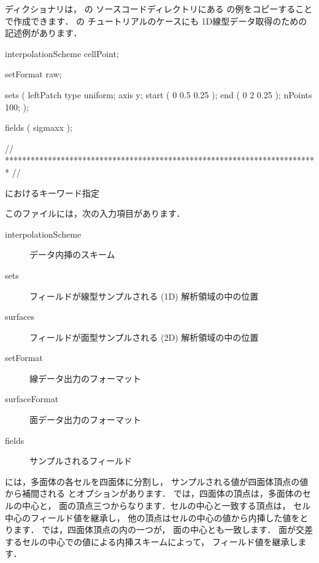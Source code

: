 ディクショナリは，
の
ソースコードディレクトリにある
\/の例をコピーすることで作成できます．
\/の
チュートリアルのケースにも
1D線型データ取得のための記述例があります．
\begin{OFverbatim}[file, linenum=17]

interpolationScheme cellPoint;

setFormat       raw;

sets
(
    leftPatch
    {
        type    uniform;
        axis    y;
        start   ( 0 0.5 0.25 );
        end     ( 0 2 0.25 );
        nPoints 100;
    }
);

fields          ( sigmaxx );


// ************************************************************************* //
\end{OFverbatim}


\begin{table}[ht]
 
 \caption{におけるキーワード指定}
 \label{tbl:6.3}
\end{table}


このファイルには，次の入力項目があります．
\begin{description}
 \item[interpolationScheme] データ内挿のスキーム
 \item[sets] フィールドが線型サンプルされる (1D) 解析領域の中の位置
 \item[surfaces] フィールドが面型サンプルされる (2D) 解析領域の中の位置
 \item[setFormat] 線データ出力のフォーマット
 \item[surfaceFormat] 面データ出力のフォーマット
 \item[fields] サンプルされるフィールド
\end{description}

には，多面体の各セルを四面体に分割し，
サンプルされる値が四面体頂点の値から補間される
とオプションがあります．
では，四面体の頂点は，多面体のセルの中心と，
面の頂点三つからなります．セルの中心と一致する頂点は，
セル中心のフィールド値を継承し，
他の頂点はセルの中心の値から内挿した値をとります．
では，四面体頂点の内の一つが，
面の中心とも一致します．
面が交差するセルの中心での値による内挿スキームによって，
フィールド値を継承します．

